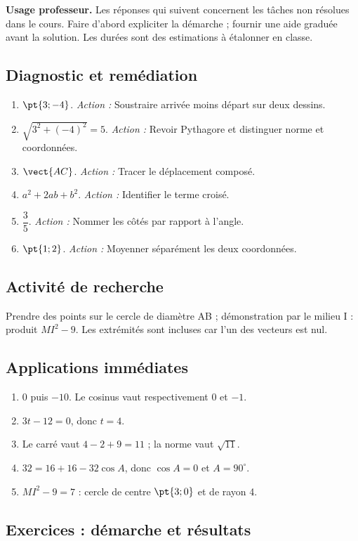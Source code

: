 \label{C03-CORR}
\textbf{Usage professeur.} Les réponses qui suivent concernent les tâches non résolues dans le cours. Faire d’abord expliciter la démarche ; fournir une aide graduée avant la solution. Les durées sont des estimations à étalonner en classe.
\subsection*{Diagnostic et remédiation}
\begin{enumerate}
\item $\pt{3;-4}$. \textit{Action :} Soustraire arrivée moins départ sur deux dessins.
\item $\sqrt{3^2+(-4)^2}=5$. \textit{Action :} Revoir Pythagore et distinguer norme et coordonnées.
\item $\vect{AC}$. \textit{Action :} Tracer le déplacement composé.
\item $a^2+2ab+b^2$. \textit{Action :} Identifier le terme croisé.
\item $\dfrac{3}{5}$. \textit{Action :} Nommer les côtés par rapport à l’angle.
\item $\pt{1;2}$. \textit{Action :} Moyenner séparément les deux coordonnées.
\end{enumerate}
\subsection*{Activité de recherche}
Prendre des points sur le cercle de diamètre AB ; démonstration par le milieu I : produit $MI^2-9$. Les extrémités sont incluses car l’un des vecteurs est nul.
\subsection*{Applications immédiates}
\begin{enumerate}
\item $0$ puis $-10$. Le cosinus vaut respectivement 0 et $-1$.
\item $3t-12=0$, donc $t=4$.
\item Le carré vaut $4-2+9=11$ ; la norme vaut $\sqrt{11}$.
\item $32=16+16-32\cos A$, donc $\cos A=0$ et $A=90^\circ$.
\item $MI^2-9=7$ : cercle de centre $\pt{3;0}$ et de rayon 4.
\end{enumerate}
\subsection*{Exercices : démarche et résultats}
